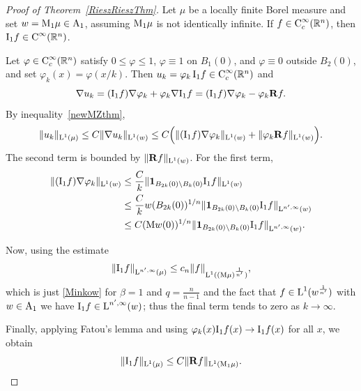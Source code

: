 \documentclass[11pt, a4paper, reqno]{amsart}
\newcommand{\R}{\mathbb R}
\newcommand{\A}{\textup A}
\newcommand{\vp}{\varphi}
\newcommand{\Lup}{\textup{L}}
\newcommand{\Con}{\textup{C}}
\theoremstyle{definition}
\theoremstyle{remark}
\begin{document}
\begin{proof}[Proof of Theorem~\ref{RieszRieszThm}]
Let $\mu$ be a locally finite Borel measure and set $w=\textup{M}_1\mu\in\A_1$, assuming $\textup{M}_1\mu$ is not identically infinite. If $f\in \Con_c^\infty(\R^n)$, then $\textup{I}_1 f\in \Con^\infty(\R^n)$.

Let $\vp\in \Con_c^\infty(\R^n)$ satisfy $0\le \vp\le 1$, $\vp\equiv 1$ on $B_1(0)$, and $\vp\equiv 0$ outside $B_2(0)$, and set $\vp_k(x)=\vp(x/k)$. Then $u_k=\vp_k\,\textup{I}_1 f\in \Con_c^\infty(\R^n)$ and
\[
\nabla u_k
=(\textup{I}_1 f)\nabla \vp_k+\vp_k\nabla \textup{I}_1 f
=(\textup{I}_1 f)\nabla \vp_k-\vp_k\mathbf{R}f.
\]
By inequality~\eqref{newMZthm},
\[
\|u_k\|_{\Lup^1(\mu)}
\le C\|\nabla u_k\|_{\Lup^1(w)}
\le C\Big(\|(\textup{I}_1 f)\nabla \vp_k\|_{\Lup^1(w)}+\|\vp_k\mathbf{R}f\|_{\Lup^1(w)}\Big).
\]
The second term is bounded by $\|\mathbf{R}f\|_{\Lup^1(w)}$. For the first term,
\begin{align*}
\|(\textup{I}_1 f)\nabla \vp_k\|_{\Lup^1(w)}
&\le \frac{C}{k}\|\mathbf 1_{B_{2k}(0)\setminus B_k(0)}\textup{I}_1 f\|_{\Lup^1(w)} \\
&\le \frac{C}{k}w(B_{2k}(0))^{1/n}
\|\mathbf 1_{B_{2k}(0)\setminus B_k(0)}\textup{I}_1 f\|_{\Lup^{n',\infty}(w)} \\
&\le C(\textup{M}w(0))^{1/n}
\|\mathbf 1_{B_{2k}(0)\setminus B_k(0)}\textup{I}_1 f\|_{\Lup^{n',\infty}(w)}.
\end{align*}

Now, using the estimate 
\[
\|\textup{I}_1 f\|_{\Lup^{n',\infty}(\mu)} \le c_n \|f\|_{\Lup^1((\textup M\mu)^{\frac{1}{n'}} )},
\]
which is just \eqref{Minkow} for $\beta=1$ and $q=\frac{n}{n-1}$ and the fact that $f\in \Lup^1(w^{\frac{1}{n'}})$ with $w\in\A_1$ we have $\textup{I}_1 f\in \Lup^{n',\infty}(w)$;  thus the final term tends to zero as $k\to\infty$.

Finally, applying Fatou’s lemma and using $\vp_k(x)\textup{I}_1 f(x)\to \textup{I}_1 f(x)$ for all $x$, we obtain
\[
\|\textup{I}_1 f\|_{\Lup^1(\mu)}
\le C\|\mathbf{R}f\|_{\Lup^1(\textup{M}_1\mu)}.
\]
\end{proof}
\end{document}
